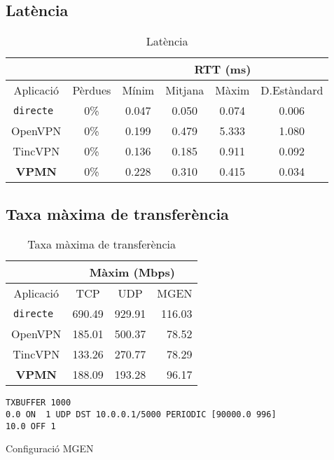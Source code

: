 \subsection{Latència}
\begin{table}[htb]
\begin{center}
\begin{tabular}{|c|c|c|c|c|c|}
\multicolumn{2}{c}{} & \multicolumn{4}{|c|}{RTT (ms)} \\ \hline
Aplicació & Pèrdues & Mínim & Mitjana & Màxim & D.Estàndard \\ \hline \hline
\tt directe & 0\% & 0.047 & 0.050 & 0.074 & 0.006 \\ \hline
OpenVPN & 0\% & 0.199 & 0.479 & 5.333 & 1.080 \\ \hline
TincVPN & 0\% & 0.136 & 0.185 & 0.911 & 0.092 \\ \hline
\bf VPMN & 0\% & 0.228 & 0.310 & 0.415 & 0.034 \\ \hline
\end{tabular}
\end{center}
\begin{center}
\caption{Latència}
\label{T:lat}
\end{center}
\end{table}

\subsection{Taxa màxima de transferència}
\begin{table}[htb]
\begin{center}
\begin{tabular}{|c|c|c|r|}
\multicolumn{1}{c}{} & \multicolumn{3}{|c|}{Màxim (Mbps)} \\ \hline
Aplicació & TCP & UDP & MGEN \\ \hline \hline
\tt directe & 690.49 & 929.91 & 116.03 \\ \hline
OpenVPN & 185.01 & 500.37 & 78.52 \\ \hline
TincVPN & 133.26 & 270.77 & 78.29 \\ \hline
\bf VPMN & 188.09 & 193.28 & 96.17 \\ \hline
\end{tabular}
\end{center}
\begin{center}
\caption{Taxa màxima de transferència}
\label{T:tax}
\end{center}
\end{table}
\begin{table}[htb]
\begin{center}
\begin{minipage}[htb]{0.6\linewidth}
\footnotesize
\begin{verbatim}
TXBUFFER 1000
0.0 ON  1 UDP DST 10.0.0.1/5000 PERIODIC [90000.0 996]
10.0 OFF 1
\end{verbatim}
\end{minipage}
\caption{Configuració MGEN}
\label{T:mgencfg}
\end{center}
\end{table}

